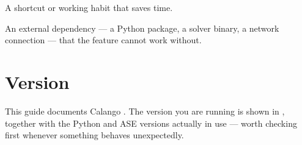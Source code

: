 \begin{caltip}
A shortcut or working habit that saves time.
\end{caltip}

\begin{calwarn}
An external dependency --- a Python package, a solver binary, a network
connection --- that the feature cannot work without.
\end{calwarn}

\section*{Version}

This guide documents Calango \textbf{\calangoversion}. The version you are running
is shown in \menusep{}, together with the
Python and ASE versions actually in use --- worth checking first whenever
something behaves unexpectedly.
